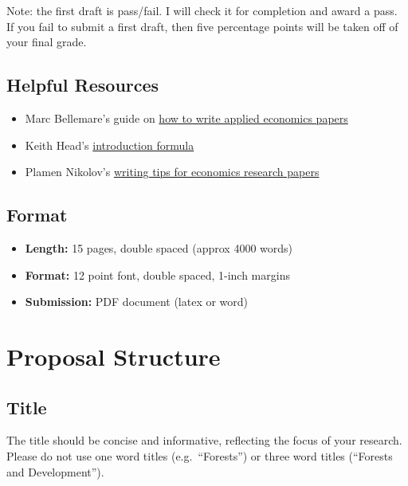 \documentclass[
]{article}
\providecommand{\tightlist}{%
  \setlength{\itemsep}{0pt}\setlength{\parskip}{0pt}}
\begin{document}
Note: the first draft is pass/fail. I will check it for completion and award a pass. If you fail to submit a first draft, then five percentage points will be taken off of your final grade.

\hypertarget{helpful-resources}{%
\subsection{Helpful Resources}\label{helpful-resources}}

\begin{itemize}
\tightlist
\item
  Marc Bellemare's guide on \href{https://marcfbellemare.com/wordpress/wp-content/uploads/2020/09/BellemareHowToPaperSeptember2020.pdf}{how to write applied economics papers}
\item
  Keith Head's \href{https://blogs.ubc.ca/khead/research/research-advice/formula}{introduction formula}
\item
  Plamen Nikolov's \href{https://docs.iza.org/dp15057.pdf}{writing tips for economics research papers}
\end{itemize}

\hypertarget{format}{%
\subsection{Format}\label{format}}

\begin{itemize}
\item
  \textbf{Length:} 15 pages, double spaced (approx 4000 words)
\item
  \textbf{Format:} 12 point font, double spaced, 1-inch margins
\item
  \textbf{Submission:} PDF document (latex or word)
\end{itemize}

\newpage

\hypertarget{proposal-structure}{%
\section{Proposal Structure}\label{proposal-structure}}

\hypertarget{title}{%
\subsection{Title}\label{title}}

The title should be concise and informative, reflecting the focus of your research. Please do not use one word titles (e.g.~``Forests'') or three word titles (``Forests and Development'').
\end{document}
